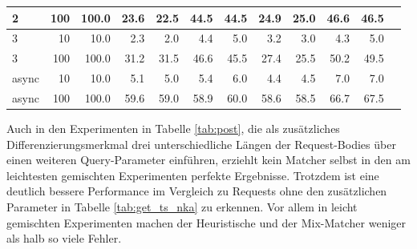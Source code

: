 \documentclass[12pt,a4paper]{report}
\begin{document}
\begin{table}[H]
\begin{tabular}{|l|r|r|r|r|r|r|r|r|r|r|r|}
		2                        & 100                            & 100.0                          & 23.6                          & 22.5                          & 44.5                            & 44.5 & 24.9 & 25.0 & 46.6 & 46.5 \\ \hline
		3                        & 10                             & 10.0                           & 2.3                           & 2.0                           & 4.4                             & 5.0  & 3.2  & 3.0  & 4.3  & 5.0  \\ \hline
		3                        & 100                            & 100.0                          & 31.2                          & 31.5                          & 46.6                            & 45.5 & 27.4 & 25.5 & 50.2 & 49.5 \\ \hline
		async                    & 10                             & 10.0                           & 5.1                           & 5.0                           & 5.4                             & 6.0  & 4.4  & 4.5  & 7.0  & 7.0  \\ \hline
		async                    & 100                            & 100.0                          & 59.6                          & 59.0                          & 58.9                            & 60.0 & 58.6 & 58.5 & 66.7 & 67.5 \\ \hline
	\end{tabular}
\end{table}

Auch in den Experimenten in Tabelle \ref{tab:post}, die als zusätzliches Differenzierungsmerkmal drei unterschiedliche Längen der
Request-Bodies über einen weiteren Query-Parameter einführen, erziehlt kein Matcher selbst in den am leichtesten gemischten
Experimenten perfekte Ergebnisse. Trotzdem ist eine deutlich bessere Performance im Vergleich zu Requests ohne den zusätzlichen
Parameter in Tabelle \ref{tab:get_ts_nka} zu erkennen. Vor allem in leicht gemischten Experimenten machen der Heuristische und der
Mix-Matcher weniger als halb so viele Fehler.
\end{document}

